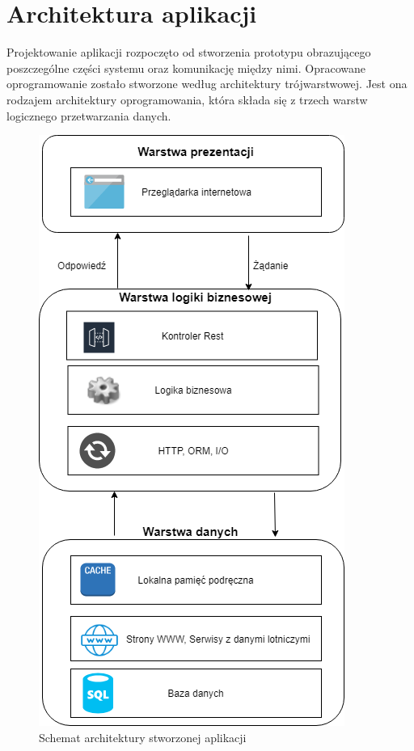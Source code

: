 \documentclass[12pt, twoside]{report}
\begin{document}
\section{Architektura aplikacji}
Projektowanie aplikacji rozpoczęto od stworzenia prototypu obrazującego poszczególne części systemu oraz komunikację między nimi. Opracowane oprogramowanie zostało stworzone według architektury trójwarstwowej. Jest ona rodzajem architektury oprogramowania, która składa się z trzech warstw logicznego przetwarzania danych\cite{architektura}.

\begin{figure}[!ht]
\centering
\includegraphics[scale=0.60, keepaspectratio]{architecure_diagram.png}
\caption{Schemat architektury stworzonej aplikacji}
\label{fig:architecure_diagram}
\end{figure}
\end{document}
